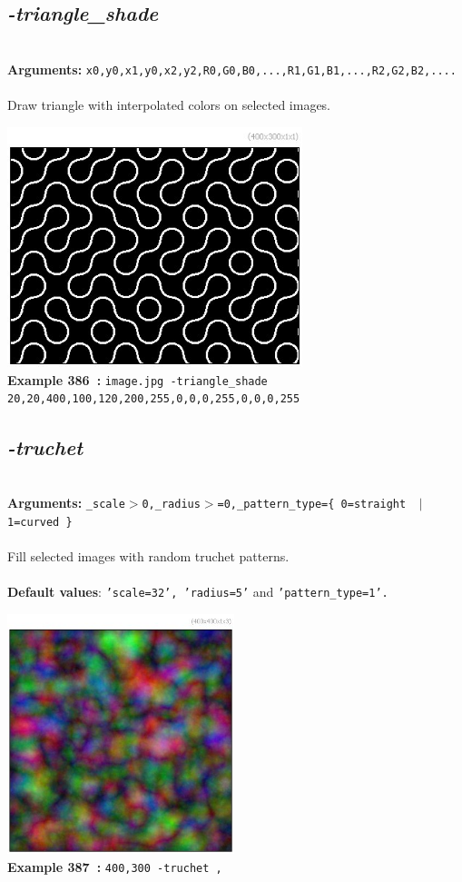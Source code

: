 \documentclass[a4paper,11pt,twoside]{book}
\begin{document}
\subsection{\emph{-triangle\_shade} }\vspace*{-0.5em}
~\\\textbf{Arguments: } 
{\small \texttt{x0,y0,x1,y0,x2,y2,R0,G0,B0,...,R1,G1,B1,...,R2,G2,B2,....}}\\~\\
Draw triangle with interpolated colors on selected images.
\begin{center}\includegraphics[keepaspectratio=true,height=7cm,width=\textwidth]{img/gmic_def386.jpg}\\
{\footnotesize \textbf{Example 386~:} \texttt{image.jpg -triangle\_shade 20,20,400,100,120,200,255,0,0,0,255,0,0,0,255}}
\end{center}

\subsection{\emph{-truchet} }\vspace*{-0.5em}
~\\\textbf{Arguments: } 
{\small \texttt{\_scale$>$0,\_radius$>$=0,\_pattern\_type=\{ 0=straight ~$|$~ 1=curved \}}}\\~\\
Fill selected images with random truchet patterns.
~\\~\\\textbf{Default values}: {\small \texttt{'scale=32', 'radius=5'} and \texttt{'pattern\_type=1'.}}
\begin{center}\includegraphics[keepaspectratio=true,height=7cm,width=\textwidth]{img/gmic_def387.jpg}\\
{\footnotesize \textbf{Example 387~:} \texttt{400,300 -truchet ,}}
\end{center}
\end{document}
